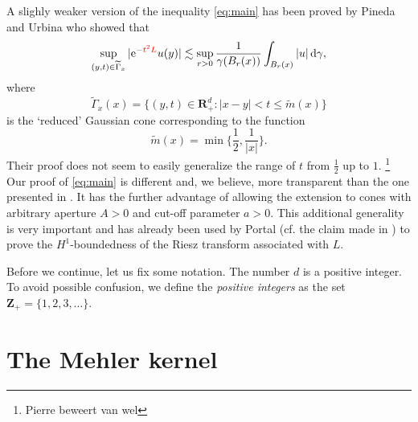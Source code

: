 \documentclass{amsart}
\theoremstyle{remark}
\newcommand{\D}{\,\textup{d}}
\renewcommand{\leq}{\leqslant}
\renewcommand{\leq}{\leqslant}
\newcommand{\R}{\mathbf R}
\newcommand{\Z}{\mathbf Z}
\newcommand{\e}{\mathrm{e}} %
\renewcommand{\leq}{\leqslant}%
\newcommand{\red}{\color{red}}
\begin{document}
A slighly weaker version of the inequality \eqref{eq:main} has been proved by 
Pineda and Urbina \cite{Pineda2008} who showed that 
\begin{equation*}
  \sup_{(y, t) \in \widetilde{\Gamma}_x} |\e^{-{\red t^2 L}} u(y)|
  \lesssim \sup_{r > 0}  \frac1{\gamma(B_r(x))}\int_{B_r(x)} |u| \D\gamma,
\end{equation*}
where
\begin{equation*}
  \widetilde{\Gamma}_x(x) = \{(y, t) \in \R^d_+ : |x - y| < t \leq
  \widetilde{m}(x)\}
\end{equation*}
is the `reduced' Gaussian cone corresponding to the function
\begin{equation*}
  \widetilde{m}(x) = \min\biggl\{\frac12, \frac1{|x|}\biggr\}.
\end{equation*}
Their proof does not seem to easily generalize the range of $t$ from $\frac12$ up
to $1$. \footnote{Pierre beweert van wel}
Our proof of \eqref{eq:main} is different and, we believe, more transparent 
than the one presented in \cite{Pineda2008}. It has the further advantage of allowing 
the extension to cones
with arbitrary aperture $A>0$ and cut-off parameter $a>0$. This additional generality
is very important and has already been used by Portal (cf. 
the claim made in \cite[discussion preceding Lemma 2.3]{Portal2012}) to prove the 
$H^1$-boundedness of the Riesz transform associated with $L$.

Before we continue, let us fix some notation.  
The number $d$ is a positive integer. To avoid possible confusion, we define
the \emph{positive integers} as the set $\Z_+ = \{1, 2, 3, \dots\}$. 


% 
% 
% 


\section{The Mehler kernel}
\end{document}

